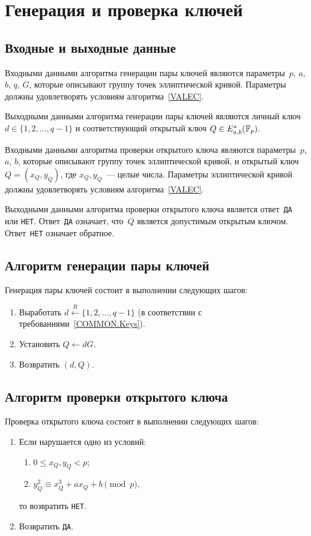 \section{Генерация и проверка ключей}\label{KEYS}

\subsection{Входные и выходные данные}

Входными данными алгоритма генерации пары ключей
являются параметры~$p$, $a$, $b$, $q$, $G$, 
которые описывают группу точек эллиптической кривой.
Параметры должны удовлетворять условиям 
алгоритма~\ref{VALEC}.

Выходными данными алгоритма генерации пары ключей 
являются личный ключ $d\in\{1,2,\ldots,q-1\}$
и соответствующий открытый ключ $Q\in E_{a,b}^*(\mathbb{F}_p)$.

Входными данными алгоритма проверки открытого ключа 
являются параметры~$p$, $a$, $b$, 
которые описывают группу точек эллиптической кривой,
и открытый ключ~$Q=(x_Q,y_Q)$, где $x_Q, y_Q$~--- целые числа.
%
Параметры эллиптической кривой должны удовлетворять условиям
алгоритма~\ref{VALEC}.

Выходными данными алгоритма проверки открытого ключа 
является ответ~\texttt{ДА} или \texttt{НЕТ}. 
Ответ~\texttt{ДА} означает, что~$Q$ является допустимым открытым ключом.
Ответ~\texttt{НЕТ} означает обратное.

\subsection{Алгоритм генерации пары ключей}\label{GENKEYPAIR}

Генерация пары ключей состоит в выполнении следующих шагов:
\begin{enumerate}
\item
Выработать $d\stackrel{R}{\leftarrow}\{1,2,\ldots,q-1\}$
(в соответствии с требованиями~\ref{COMMON.Keys}).

\item
Установить $Q\leftarrow dG$.

\item
Возвратить $(d,Q)$.
\end{enumerate}

\subsection{Алгоритм проверки открытого ключа}\label{VALPUBKEY}

Проверка открытого ключа состоит в выполнении следующих шагов:
\begin{enumerate}
\item
Если нарушается одно из условий:
\begin{enumerate}
\item
$0\leq x_Q,y_Q<p$;
\item
$y_Q^2\equiv x_Q^3+ax_Q+b\pmod{p}$,
\end{enumerate}
то возвратить \texttt{НЕТ}.

\item
Возвратить \texttt{ДА}.
\end{enumerate}

